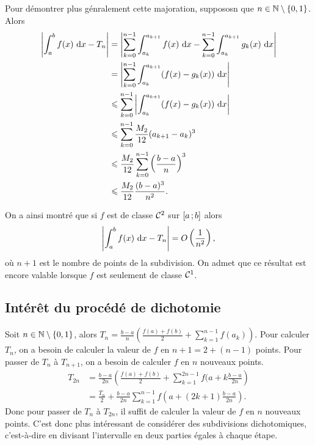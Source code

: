Pour démontrer plus génralement cette majoration, suppososn que \(n \in 
\mathbb{N}\setminus\{0,1\}\). Alors
\begin{align*}
  \left|\int_a^b f(x)\,\mathop{}\mathopen{}\mathrm{d} x-T_{n}\right| &= \left| \sum_{k = 0}^{n-1} 
  \int_{a_k}^{a_{k+1}} f(x)\,\mathop{}\mathopen{}\mathrm{d} x -  \sum_{k = 0}^{n-1} \int_{a_k}^{a_{k+1}} 
  g_k(x)\,\mathop{}\mathopen{}\mathrm{d} x \right| \\
  &= \left| \sum_{k = 0}^{n-1} \int_{a_k}^{a_{k+1}} (f(x) -g_k(x))\,\mathop{}\mathopen{}\mathrm{d} x 
  \right| \\
  &\leqslant \sum_{k = 0}^{n-1} \left|\int_{a_k}^{a_{k+1}} (f(x) -g_k(x))\,\mathop{}\mathopen{}\mathrm{d} x 
  \right| \\
  &\leqslant \sum_{k = 0}^{n-1} \frac{M_2}{12} (a_{k+1}-a_k)^3 \\
  &\leqslant \frac{M_2}{12} \sum_{k = 0}^{n-1} \left(\frac{b-a}{n}\right)^3 \\
  &\leqslant \frac{M_2}{12} \frac{(b-a)^3}{n^2}.
\end{align*}

On a ainsi montré que si \(f\) est de classe \(\mathcal{C}^{2}\) sur 
\(\left[ a \, ; {} b \right]\) alors
\begin{equation}
  \left|\int_a^b f(x)\,\mathop{}\mathopen{}\mathrm{d} x-T_n \right| = O\left(\frac{1}{n^2}\right),
\end{equation}
où \(n+1\) est le nombre de points de la subdivision. On admet que ce résultat 
est encore valable lorsque \(f\) est seulement de classe \(\mathcal{C}^{1}\).

\subsection{Intérêt du procédé de dichotomie}

Soit \(n \in \mathbb{N}\setminus\{0,1\}\), alors \(T_n = 
\frac{b-a}{n}\left(\frac{f(a)+f(b)}{2} + \sum_{k = 1}^{n-1}f(a_k)\right)\). Pour 
calculer \(T_n\), on a besoin de calculer la valeur de \(f\) en \(n+1 = 2+(n-1)\) 
points. Pour passer de \(T_n\) à \(T_{n+1}\), on a besoin de calculer \(f\) en 
\(n\) nouveaux points.
\begin{align*}
  T_{2n} &= \frac{b-a}{2n}\left(\frac{f(a)+f(b)}{2} + \sum_{k = 1}^{2n-1}f(a+k 
  \frac{b-a}{2n}\right)\\
  & = \frac{T_n}{2} + \frac{b-a}{2n}  
  \sum_{k = 1}^{n-1}f\left(a+(2k+1)\frac{b-a}{2n}\right).
\end{align*}
Donc pour passer de \(T_n\) à \(T_{2n}\), il suffit de calculer la valeur de 
\(f\) en \(n\) nouveaux points. C'est donc plus intéressant de considérer des 
subdivisions dichotomiques, c'est-à-dire en divisant l'intervalle en deux 
parties égales à chaque étape.

